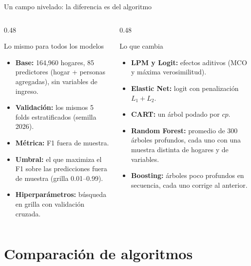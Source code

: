 \documentclass[aspectratio=169, 10pt]{beamer}
\begin{document}
\begin{frame}{Un campo nivelado: la diferencia es del algoritmo}
\begin{columns}[c]
\begin{column}{0.48\textwidth}
\begin{block}{Lo mismo para todos los modelos}
\small
\begin{itemize}\setlength\itemsep{0.7em}
\item \textbf{Base:} 164,960 hogares, 85 predictores (hogar + personas agregadas), sin variables de ingreso.
\item \textbf{Validación:} los mismos 5 folds estratificados (semilla 2026).
\item \textbf{Métrica:} F1 fuera de muestra.
\item \textbf{Umbral:} el que maximiza el F1 sobre las predicciones fuera de muestra (grilla 0.01--0.99).
\item \textbf{Hiperparámetros:} búsqueda en grilla con validación cruzada.
\end{itemize}
\end{block}
\end{column}
\begin{column}{0.48\textwidth}
\begin{block}{Lo que cambia}
\small
\begin{itemize}\setlength\itemsep{0.7em}
\item \textbf{LPM y Logit:} efectos aditivos (MCO y máxima verosimilitud).
\item \textbf{Elastic Net:} logit con penalización $L_1 + L_2$.
\item \textbf{CART:} un árbol podado por $cp$.
\item \textbf{Random Forest:} promedio de 300 árboles profundos, cada uno con una muestra distinta de hogares y de variables.
\item \textbf{Boosting:} árboles poco profundos en secuencia, cada uno corrige al anterior.
\end{itemize}
\end{block}
\end{column}
\end{columns}
\end{frame}

\section{Comparación de algoritmos}
\end{document}
